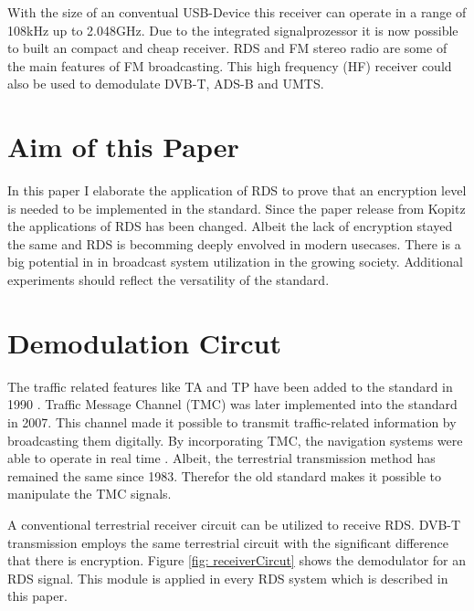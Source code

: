\documentclass[conference,12pt,a4paper]{IEEEtran}
\begin{document}
	With the size of an conventual USB-Device this receiver can operate in a range of 108kHz up to 2.048GHz. Due to the integrated signalprozessor it is now possible to built an compact and cheap receiver. RDS and FM stereo radio are some of the main features of  FM broadcasting. This high frequency (HF) receiver could also be used to demodulate DVB-T, ADS-B and UMTS. \\
	
	
	\section{Aim of this Paper}
	
	In this paper I elaborate the application of RDS to prove that an encryption level is needed to be implemented in the standard. Since the paper release from Kopitz \cite{Dietman} the applications of RDS has been changed. Albeit the lack of encryption stayed the same and RDS is becomming deeply envolved in modern usecases. There is a big potential in in broadcast system utilization in the growing society. Additional experiments should reflect the versatility of the standard.\\


	\section{Demodulation Circut}
		
	The traffic related features like TA and TP have been added  to the standard in 1990 \cite{TATP}. Traffic Message Channel (TMC) was later implemented into the standard in 2007. This channel made it possible to transmit traffic-related information by broadcasting them digitally. By incorporating TMC, the navigation systems were able to operate in real time  \cite{barca2017radio}. Albeit, the terrestrial transmission method has remained the same since 1983. Therefor the old standard makes it possible to manipulate the TMC signals.
	
	A conventional terrestrial receiver circuit can be utilized to receive RDS. DVB-T transmission employs the same terrestrial circuit with the significant difference that there is encryption. Figure \ref{fig: receiverCircut} shows the demodulator for an RDS signal. This module is applied in every RDS system which is described in this paper.
	
\end{document}
